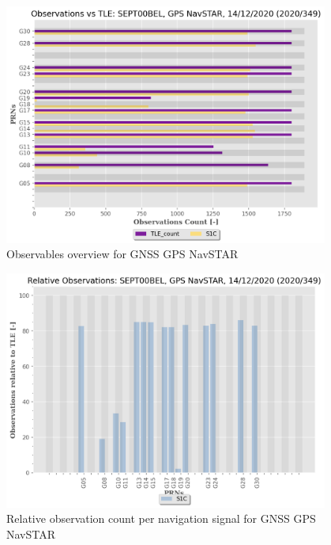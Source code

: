 \begin{figure}[H]%
\centering%
\includegraphics[width=0.95\textwidth]{png/SEPT00BEL_R_20203491400_30M_01S_MO_G-ObsTLE.png}%
\caption{\label{fig:obst_gnss_G} Observables overview for GNSS GPS NavSTAR}%
\end{figure}

%


\begin{figure}[H]%
\centering%
\includegraphics[width=0.95\textwidth]{png/SEPT00BEL_R_20203491400_30M_01S_MO_G-PERC.png}%
\caption{\label{fig:prec_obst_gnss_G} Relative observation count per navigation signal for GNSS GPS NavSTAR}%
\end{figure}

%
\clearpage

